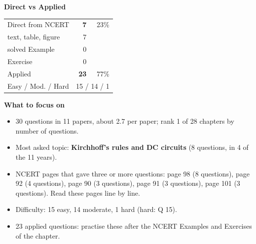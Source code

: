 \begin{minipage}[t]{0.34\linewidth}{\small\textbf{\color{crimson}Direct vs Applied}\par\smallskip
\begin{tabular}{@{}lrr@{}}\toprule
Direct from NCERT & \textbf{7} & 23\%\\
\quad text, table, figure & 7 &\\
\quad solved Example & 0 &\\
\quad Exercise & 0 &\\
Applied & \textbf{23} & 77\%\\\midrule
Easy / Mod. / Hard & \multicolumn{2}{r}{15 / 14 / 1}\\\bottomrule
\end{tabular}}\end{minipage}\hfill
\begin{minipage}[t]{0.63\linewidth}{\small\textbf{\color{crimson}What to focus on}\par\smallskip
\begin{itemize}[leftmargin=1.1em,itemsep=1pt,topsep=0pt]
\item 30 questions in 11 papers, about 2.7 per paper; rank 1 of 28 chapters by number of questions.
\item Most asked topic: \textbf{Kirchhoff's rules and DC circuits} (8 questions, in 4 of the 11 years).
\item NCERT pages that gave three or more questions: page 98 (8 questions), page 92 (4 questions), page 90 (3 questions), page 91 (3 questions), page 101 (3 questions). Read these pages line by line.
\item Difficulty: 15 easy, 14 moderate, 1 hard (hard: Q 15).
\item 23 applied questions: practise these after the NCERT Examples and Exercises of the chapter.
\end{itemize}}\end{minipage}\par
{}
